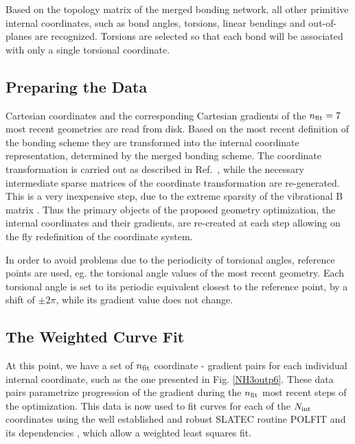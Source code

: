 \documentclass[prl,twocolumn,showpacs,twocolumngrid,superbib]{revtex4}
\begin{document}
Based on the topology matrix of the merged bonding network, all other primitive 
internal coordinates, such as bond angles, torsions, linear bendings and 
out-of-planes are recognized. Torsions are selected so that each bond will be 
associated with only a single torsional coordinate.

\subsection{Preparing the Data}

Cartesian coordinates and the corresponding Cartesian gradients of the $n_{\rm fit}=7$ 
most recent geometries are read from disk. Based on the most recent definition of the 
bonding scheme they are transformed into the internal coordinate representation,
determined by the merged bonding scheme.
The coordinate transformation is carried out as described in Ref.~\cite{nemeth_coordtrf1}, 
while the necessary intermediate sparse matrices of 
the coordinate transformation are re-generated. 
This is a very inexpensive step, due to the extreme sparsity of the vibrational B matrix \cite{wilson}. 
Thus the primary objects of the proposed geometry optimization,  the internal coordinates and their gradients,
are re-created at each step allowing on the fly redefinition of the 
coordinate system.

In order to avoid problems due to the periodicity of torsional angles, reference points are used, 
eg. the torsional angle values of the most recent geometry. Each torsional angle is set to its 
periodic equivalent closest to the reference point, by a shift of $\pm 2\pi$, while its gradient value does not change.

\subsection{The Weighted Curve Fit}

At this point,  we have a set of $n_{\rm fit}$ coordinate - gradient pairs for each individual 
internal coordinate, such as the one presented in Fig. \ref{NH3outp6}. These data 
pairs parametrize progression of the gradient during the $n_{\rm fit}$ most recent steps of the 
optimization.  This data is now used to fit curves for each of the $N_{\rm int}$ coordinates using the 
well established and robust {\sc SLATEC} routine {\sc POLFIT} and its dependencies \cite{slatec}, 
which allow a weighted least squares fit.
\end{document}
